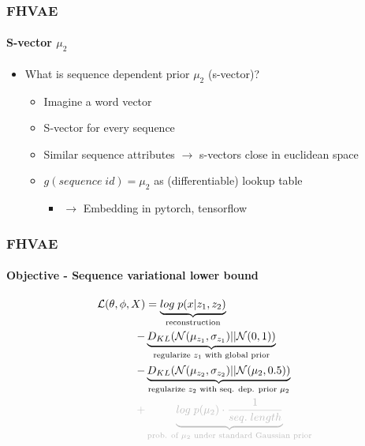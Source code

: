 \documentclass[9pt]{beamer}
\begin{document}
\begin{frame}
\frametitle{FHVAE}
\framesubtitle{S-vector $\mu_2$}
\begin{itemize}
	\item What is sequence dependent prior $\mu_2$ (s-vector)?
	\begin{itemize}
		\item Imagine a word vector 
		\item S-vector for every sequence
		\item Similar sequence attributes $\rightarrow$ s-vectors close in euclidean space
		\item $g(sequence\;id) = \mu_2$ as (differentiable) lookup table
		\begin{itemize}
			\item $\rightarrow$ Embedding in pytorch, tensorflow
		\end{itemize}
	\end{itemize}
\end{itemize}
\end{frame} 



\begin{frame}
\frametitle{FHVAE}
\framesubtitle{Objective - Sequence variational lower bound}
\begin{align*}
\mathcal{L}(\theta, \phi, X)& = %
\underbrace{log\;p(x|z_1, z_2)}_{\text{reconstruction}}\\%
-&\underbrace{D_{KL}(\mathcal{N}(\mu_{z_1}, \sigma_{z_1})||\mathcal{N}(0,1))}_{\text{regularize $z_1$ with global prior}}\\
-&\underbrace{D_{KL}(\mathcal{N}(\mu_{z_2}, \sigma_{z_2})||\mathcal{N}(\mu_2,0.5))}_{\text{regularize $z_2$ with seq. dep. prior $\mu_2$}}\\
\color{lightgray}+&\color{lightgray}\underbrace{log\;p(\mu_2) \cdot \frac{1}{seq.\;length}}_{\text{prob. of $\mu_2$ under standard Gaussian prior}}
\end{align*}
\end{frame} 
\end{document}
